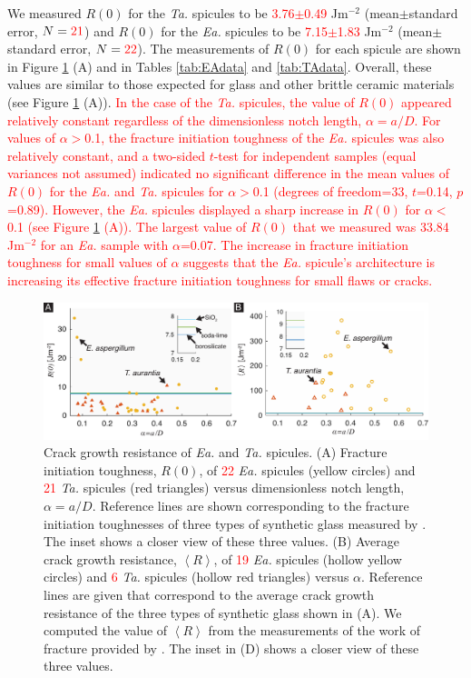 \documentclass[12pt,onecolumn]{article}
\makeatletter
\newcommand{\TA}{\textit{Ta.\@}\xspace}
\newcommand{\EA}{\textit{Ea.\@}\xspace}
\makeatother
\begin{document}
\begin{bibunit}
We measured $R(0)$ for the \TA spicules to be \textcolor{red}{3.76$\pm$0.49} Jm$^{-2}$ (mean$\pm$standard error, $N=\textcolor{red}{21}$) and $R(0)$ for the \EA spicules to be \textcolor{red}{7.15$\pm$1.83} Jm$^{-2}$ (mean$\pm$standard error, $N=\textcolor{red}{22}$). The measurements of $R(0)$ for each spicule are shown in Figure \ref{fig:R} (A) and in Tables \ref{tab:EAdata} and \ref{tab:TAdata}. Overall, these values are similar to those expected for glass and other brittle ceramic materials (see Figure \ref{fig:R} (A)). \textcolor{red}{In the case of the \TA spicules, the value of $R(0)$ appeared relatively constant regardless of the dimensionless notch length, $\alpha=a/D$. For values of $\alpha>$0.1, the fracture initiation toughness of the \EA spicules was also relatively constant, and a two-sided $t$-test for independent samples (equal variances not assumed) indicated no significant difference in the mean values of $R(0)$ for the \EA and \TA spicules for $\alpha>$0.1 (degrees of freedom=33, $t$=0.14, $p$=0.89). However, the \EA spicules displayed a sharp increase in $R(0)$ for $\alpha<$0.1 (see Figure \ref{fig:R} (A)). The largest value of $R(0)$ that we measured was 33.84 Jm$^{-2}$ for an \EA sample with $\alpha$=0.07. The increase in fracture initiation toughness for small values of $\alpha$ suggests that the \EA spicule's architecture is increasing its effective fracture initiation toughness for small flaws or cracks.}
%
			\begin{figure}[ht!]
			\centering
			\includegraphics[width=\textwidth]{../Figures/FigureR/Figure5_V7.pdf}
			\caption{Crack growth resistance of \EA and \TA spicules. (A) Fracture initiation toughness, $R(0)$, of \textcolor{red}{22} \EA spicules (yellow circles) and \textcolor{red}{21} \TA spicules (red triangles) versus dimensionless notch length, $\alpha=a/D$. Reference lines are shown corresponding to the fracture initiation toughnesses of three types of synthetic glass measured by \cite{wiederhorn1969fracture}. The inset shows a closer view of these three values. (B) Average crack growth resistance, $\left< R \right>$, of \textcolor{red}{19} \EA spicules (hollow yellow circles) and \textcolor{red}{6} \TA spicules (hollow red triangles) versus $\alpha$.  Reference lines are given that correspond to the average crack growth resistance of the three types of synthetic glass shown in (A). We computed the value of $\left< R \right>$ from the measurements of the work of fracture provided by \cite{wiederhorn1969fracture}. The inset in (D) shows a closer view of these three values.}
			\label{fig:R}
			\end{figure}


\end{bibunit}
\end{document}
